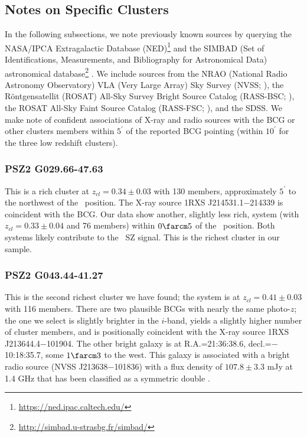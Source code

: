 \documentclass[apj, revtex4-1]{emulateapj}
\begin{document}
\subsection{Notes on Specific Clusters}
In the following subsections, we note previously known sources by querying the NASA/IPCA Extragalactic Database (NED)\footnote{\url{https://ned.ipac.caltech.edu/}} and the SIMBAD (Set of Identifications, Measurements, and Bibliography for Astronomical Data) astronomical database\footnote{\url{http://simbad.u-strasbg.fr/simbad/}} \citep{Wenger2000}. We include sources from the NRAO (National Radio Astronomy Observatory) VLA (Very Large Array) Sky Survey (NVSS; \citealt{Condon1998}), the R\"{o}ntgensatellit (ROSAT) All-Sky Survey Bright Source Catalog (RASS-BSC; \citealt{Voges1999a}), the ROSAT All-Sky Faint Source Catalog (RASS-FSC; \citealt{Voges2000}), and the SDSS. We make note of confident associations of X-ray and radio sources with the BCG or other clusters members within $5^\prime$ of the reported BCG pointing (within $10^\prime$ for the three low redshift clusters).

\subsubsection{PSZ2 G029.66-47.63} %
This is a rich cluster at $z_{cl} = 0.34 \pm 0.03$ with 130 members, approximately $5^\prime$ to the northwest of the \planck\ position. The X-ray source 1RXS J214531.1$-$214339 is coincident with the BCG. Our data show another, slightly less rich, system (with $z_{cl} = 0.33 \pm 0.04$ and 76 members) within $0\farcm5$ of the \planck\ position. Both systems likely contribute to the \planck\ SZ signal. This is the richest cluster in our sample.

\subsubsection{PSZ2 G043.44-41.27} %
This is the second richest cluster we have found; the system is at $z_{cl} = 0.41 \pm 0.03$ with 116 members. There are two plausible BCGs with nearly the same photo-$z$; the one we select is slightly brighter in the $i$-band, yields a slightly higher number of cluster members, and is positionally coincident with the X-ray source 1RXS J213644.4$-$101904. The other bright galaxy is at R.A.=21:36:38.6, decl.=$-$10:18:35.7, some $1\farcm3$ to the west. This galaxy is associated with a bright radio source (NVSS J213638$-$101836) with a flux density of $107.8 \pm 3.3$ mJy at 1.4 GHz that has been classified as a symmetric double \citep{Douglas1996}.
\end{document}
